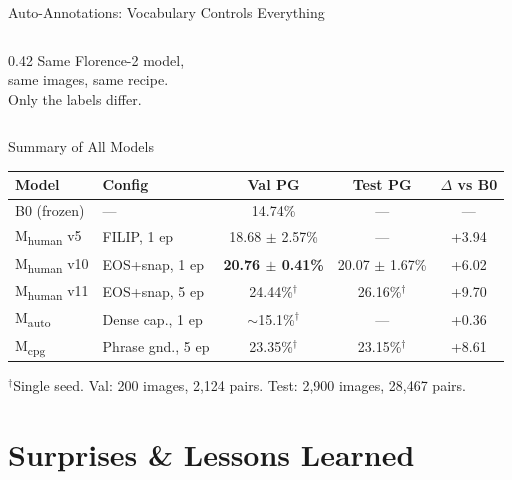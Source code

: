 \documentclass[aspectratio=169,12pt]{beamer}
\newcommand{\plus}[1]{{\color{positive}+#1}}
\newcommand{\mhuman}{M\textsubscript{human}}
\newcommand{\mauto}{M\textsubscript{auto}}
\newcommand{\mcpg}{M\textsubscript{cpg}}
\begin{document}
\begin{frame}{Auto-Annotations: Vocabulary Controls Everything}
\begin{columns}[T]
\begin{column}{0.42\textwidth}
      \vspace{1em}
      {\small\color{muted}
        Same Florence-2 model,\\
        same images, same recipe.\\
        \alert{Only the labels differ.}
      }
    \end{column}
  \end{columns}
\end{frame}

\begin{frame}{Summary of All Models}
  \begin{center}
    \small
    \begin{tabular}{l l c c c}
      \toprule
      Model & Config & Val PG & Test PG & $\Delta$ vs B0 \\
      \midrule
      B0 (frozen) & — & 14.74\% & — & — \\
      \midrule
      \mhuman{} v5 & FILIP, 1 ep & 18.68 $\pm$ 2.57\% & — & \plus{3.94} \\
      \mhuman{} v10 & EOS+snap, 1 ep & \textbf{20.76 $\pm$ 0.41\%} & 20.07 $\pm$ 1.67\% & \plus{6.02} \\
      \mhuman{} v11 & EOS+snap, 5 ep & 24.44\%$^\dagger$ & 26.16\%$^\dagger$ & \plus{9.70} \\
      \midrule
      \mauto{} & Dense cap., 1 ep & $\sim$15.1\%$^\dagger$ & — & \plus{0.36} \\
      \mcpg{} & Phrase gnd., 5 ep & 23.35\%$^\dagger$ & 23.15\%$^\dagger$ & \plus{8.61} \\
      \bottomrule
    \end{tabular}

    \vspace{0.3em}
    {\footnotesize $^\dagger$Single seed. Val: 200 images, 2,124 pairs. Test: 2,900 images, 28,467 pairs.}
  \end{center}
\end{frame}

\section{Surprises \& Lessons Learned}
\end{document}
